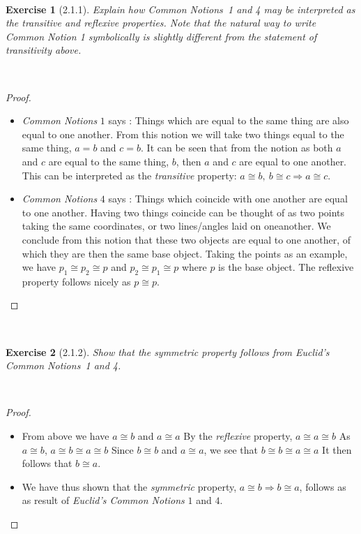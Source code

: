 \documentclass[12pt]{article}
\newcommand{\XB}{\color{black}}
\newcommand{\XBB}{\color{blue}}
\theoremstyle{plain}
\newtheorem{ex}{Exercise}
\begin{document}
\newpage
\XBB\hrulefill\XB \\
\begin{ex} [2.1.1]
  Explain how Common Notions~1 and 4 may be interpreted as the transitive and reflexive properties. Note that the natural way to write Common Notion 1 symbolically is slightly different from the statement of transitivity above.
\end{ex}
\XBB\hrulefill\XB \\
\begin{proof}
  \ \\
  \begin{itemize}
    \item \textit{Common Notions} $1$ says : Things which are equal to the same thing are also equal to one another.
    \subitem From this notion we will take two things equal to the same thing, $ a = b $ and $ c = b $.
    \subitem It can be seen that from the notion as both $ a $ and $ c $ are equal to the same thing, $ b $, then $ a $ and $ c $ are equal to one another.
    \subitem This can be interpreted as the \textit{transitive} property: $ a \cong b, \ b \cong c \Rightarrow a \cong c $.
    \item \textit{Common Notions} $4$ says : Things which coincide with one another are equal to one another.
    \subitem Having two things coincide can be thought of as two points taking the same coordinates, or two lines/angles laid on oneanother.
    \subitem We conclude from this notion that these two objects are equal to one another, of which they are then the same base object.
    \subitem Taking the points as an example, we have $ p_1 \cong p_2 \cong p $ and $ p_2 \cong p_1 \cong p $ where $ p $ is the base object.
    \subitem The reflexive property follows nicely as $ p \cong  p $.
  \end{itemize}
\end{proof}

\newpage
\XBB\hrulefill\XB \\
\begin{ex} [2.1.2]
  Show that the symmetric property follows from Euclid's Common Notions~1 and 4.
\end{ex}
\XBB\hrulefill\XB \\
\begin{proof}
  \ \\
  \begin{itemize}
    \item From above we have $ a \cong b $ and $ a \cong a $
    \subitem By the \textit{reflexive} property, $ a \cong a \cong b $
    \subitem As $ a \cong b $, $ a \cong b \cong a \cong b $
    \subitem Since $ b \cong b $ and $ a \cong a $, we see that $ b \cong b \cong a \cong a $
    \subitem It then follows that $ b \cong a $.
    \item We have thus shown that the \textit{symmetric} property, $ a \cong b \Rightarrow b \cong a $, follows as as result of \textit{Euclid's Common Notions} $1$ and $4$.
  \end{itemize}
\end{proof}
\end{document}
